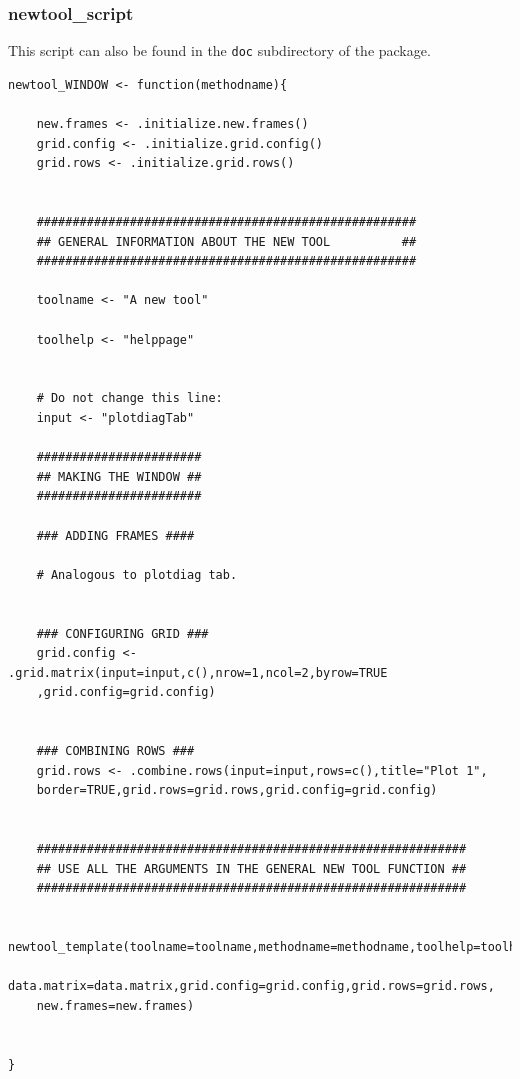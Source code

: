 \documentclass[a4paper]{article}\usepackage[]{graphicx}\usepackage[]{color}
\begin{document}
\subsubsection{newtool\_script}
\noindent This script can also be found in the \verb|doc| subdirectory of the
package.
\begin{verbatim}
newtool_WINDOW <- function(methodname){  
	
	new.frames <- .initialize.new.frames()
	grid.config <- .initialize.grid.config()
	grid.rows <- .initialize.grid.rows()
	
	
	#####################################################
	## GENERAL INFORMATION ABOUT THE NEW TOOL		   ##
	#####################################################
		
	toolname <- "A new tool"
	
	toolhelp <- "helppage"
	
	
	# Do not change this line:
	input <- "plotdiagTab"
	
	#######################
	## MAKING THE WINDOW ##
	#######################
	
	### ADDING FRAMES ####
	
	# Analogous to plotdiag tab.
	
	
	### CONFIGURING GRID ###
	grid.config <- .grid.matrix(input=input,c(),nrow=1,ncol=2,byrow=TRUE
    ,grid.config=grid.config)
	
	
	### COMBINING ROWS ###
	grid.rows <- .combine.rows(input=input,rows=c(),title="Plot 1",
    border=TRUE,grid.rows=grid.rows,grid.config=grid.config)
	
	
	############################################################
	## USE ALL THE ARGUMENTS IN THE GENERAL NEW TOOL FUNCTION ##
	############################################################
	
	newtool_template(toolname=toolname,methodname=methodname,toolhelp=toolhelp,
    data.matrix=data.matrix,grid.config=grid.config,grid.rows=grid.rows,
    new.frames=new.frames)
	
	
}

\end{verbatim}
\end{document}
